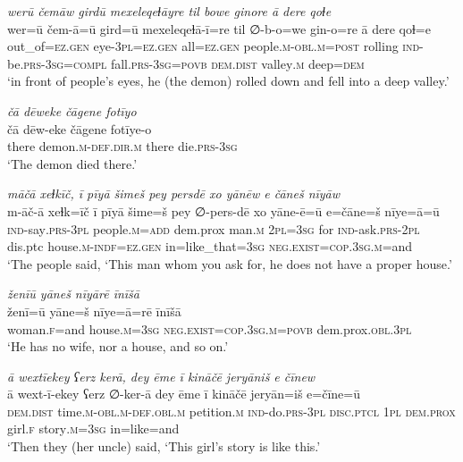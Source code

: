 \ea \label{ZP.80}
\textit{werū čemāw girdū mexeleqeɫāyre til bowe ginore ā dere qoɫe} \\ 
\gll wer=ū čem-ā=ū gird=ū mexeleqeɫā-ī=re til ∅-b-o=we gin-o=re ā dere qoɫ=e \\ 
 out\_of\textsc{\textsc{=ez.gen}} eye\textsc{-3pl}\textsc{\textsc{=ez.gen}} all\textsc{\textsc{=ez.gen}} people\textsc{.m}\textsc{-obl}\textsc{.m}\textsc{=\textsc{post}} rolling \textsc{ind-}be\textsc{.prs}\textsc{-3sg}\textsc{=compl} fall\textsc{.prs}\textsc{-3sg}\textsc{=\textsc{povb}} \textsc{dem.dist} valley\textsc{.m} deep\textsc{=dem} \\ 
\glt `in front of people’s eyes, he (the demon) rolled down and fell into a deep valley.'
\z 
 
\ea \label{ZP.81}
\textit{čā dēweke čāgene fotīyo} \\ 
\gll čā dēw-eke čāgene fotīye-o \\ 
 there demon\textsc{.m}\textsc{-def}\textsc{.dir}\textsc{.m} there die\textsc{.prs}\textsc{-3sg} \\ 
\glt `The demon died there.'
\z 
 
\ea \label{ZP.86}
\textit{māčā xeɫkīč, ī pīyā šimeš pey persdē xo yānēw e čāneš nīyāw} \\ 
\gll m-āč-ā xeɫk=īč ī pīyā šime=š pey ∅-pers-dē xo yāne-ē=ū e=čāne=š nīye=ā=ū \\ 
 \textsc{ind-}say\textsc{.prs}\textsc{-3pl} people\textsc{.m}\textsc{=add} dem.prox man\textsc{.m} \textsc{2pl}\textsc{=3sg} for \textsc{ind-}ask\textsc{.prs}-\textsc{2pl} dis.ptc house\textsc{.m}\textsc{-indf}\textsc{\textsc{=ez.gen}} in=like\_that\textsc{=3sg} \textsc{\textsc{neg.}exist}\textsc{=cop}\textsc{.3sg}\textsc{.m}=and \\ 
\glt `The people said, ‘This man whom you ask for, he does not have a proper house.'
\z 
 
\ea \label{ZP.87}
\textit{ženīū yāneš nīyārē īnīšā} \\ 
\gll ženī=ū yāne=š nīye=ā=rē īnīšā \\ 
 woman\textsc{.f}=and house\textsc{.m}\textsc{=3sg} \textsc{\textsc{neg.}exist}\textsc{=cop}\textsc{.3sg}\textsc{.m}\textsc{=\textsc{povb}} dem.prox\textsc{.obl}\textsc{.3pl} \\ 
\glt `He has no wife, nor a house, and so on.'
\z 
 
\ea \label{ZP.88}
\textit{ā wextīekey ʕerz kerā, dey ēme ī kināčē jeryāniš e čīnew} \\ 
\gll ā wext-ī-ekey ʕerz ∅-ker-ā dey ēme ī kināčē jeryān=iš e=čīne=ū \\ 
 \textsc{dem.dist} time\textsc{.m}\textsc{-obl}\textsc{.m}\textsc{-def}\textsc{.obl}\textsc{.m} petition\textsc{.m} \textsc{ind-}do\textsc{.prs}\textsc{-3pl} \textsc{disc.ptcl} \textsc{1pl} \textsc{dem.prox} girl\textsc{.f} story\textsc{.m}\textsc{=3sg} in=like=and \\ 
\glt `Then they (her uncle) said, ‘This girl’s story is like this.'
\z 
 
